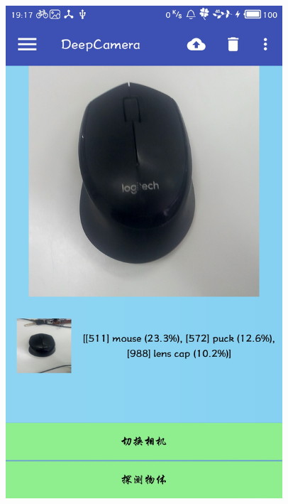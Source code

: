 \documentclass[UTF8, Microsoft YaHei]{book}
\begin{document}
\begin{figure}[!htb]
\begin{minipage}[c]{0.33\textwidth}
    \includegraphics[width=0.92\textwidth]{img/test4.png}  
    \end{minipage}
    \begin{minipage}[c]{0.33\textwidth}
    \centering

\end{minipage}
\end{figure}
\end{document}
